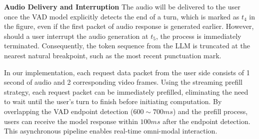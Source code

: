 \documentclass{article}
\begin{document}
\textbf{Audio Delivery and Interruption} The audio will be delivered to the user once the VAD model explicitly detects the end of a turn, which is marked as $t_4$ in the figure, even if the first packet of audio response is generated earlier. However, should a user interrupt the audio generation at $t_5$, the process is immediately terminated. Consequently, the token sequence from the LLM is truncated at the nearest natural breakpoint, such as the most recent punctuation mark.


In our implementation, each request data packet from the user side consists of 1 second of audio and 2 corresponding video frames. Using the streaming prefill strategy, each request packet can be immediately prefilled, eliminating the need to wait until the user's turn to finish before initiating computation. By overlapping the VAD endpoint detection ($600\sim700 ms$) and the prefill process, users can receive the model response within $100ms$ after the endpoint detection. This asynchronous pipeline enables real-time omni-modal interaction.



\end{document}

